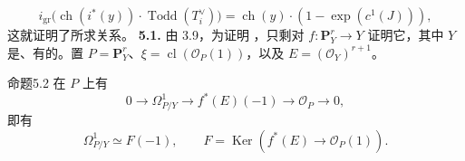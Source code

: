 \[i_{\mathrm{gr}}\bigl(\operatorname{ch}(i^*(y))\cdot\operatorname{Todd}(T_i^\vee)\bigr)=\operatorname{ch}(y)\cdot(1-\exp(c^1(J))),\]
这就证明了所求关系。
\textbf{5.1.} 由 3.9，为证明 ，只剩对 $f:\mathbf P^r_Y\to Y$ 证明它，其中 $Y$ 是、有的。置 $P=\mathbf P^r_Y$、$\xi=\operatorname{cl}(\mathscr O_P(1))$，以及 $E=(\mathscr O_Y)^{r+1}$。
\begin{SGAresult}{命题}{5.2}
在 $P$ 上有
\[0\longrightarrow\Omega^1_{P/Y}\longrightarrow f^*(E)(-1)\longrightarrow\mathscr O_P\longrightarrow0,\]
即有
\[\Omega^1_{P/Y}\simeq F(-1),\qquad F=\operatorname{Ker}(f^*(E)\longrightarrow\mathscr O_P(1)).\]
\end{SGAresult}
